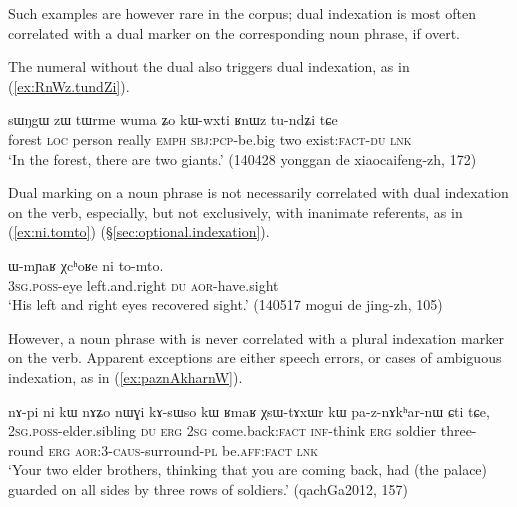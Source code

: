 Such examples are however rare in the corpus; dual indexation is most often correlated with a dual marker on the corresponding noun phrase, if overt.

The numeral  without the dual also triggers dual indexation, as in (\ref{ex:RnWz.tundZi}).

\begin{exe}
\ex \label{ex:RnWz.tundZi}
\gll   sɯŋgɯ zɯ tɯrme wuma ʑo kɯ-wxti ʁnɯz tu-ndʑi tɕe\\
forest \textsc{loc} person really \textsc{emph} \textsc{sbj}:\textsc{pcp}-be.big two exist:\textsc{fact}-\textsc{du} \textsc{lnk}\\
\glt `In the forest, there are two giants.'  (140428 yonggan de xiaocaifeng-zh, 172)
\end{exe}

Dual marking on a noun phrase is not necessarily correlated with dual indexation on the verb, especially, but not exclusively, with inanimate referents, as in (\ref{ex:ni.tomto}) (§\ref{sec:optional.indexation}).

\begin{exe}
\ex \label{ex:ni.tomto}
\gll  ɯ-mɲaʁ χcʰoʁe ni to-mto. \\
\textsc{3sg}.\textsc{poss}-eye left.and.right \textsc{du} \textsc{aor}-have.sight \\
\glt `His left and right eyes recovered sight.' (140517 mogui de jing-zh, 105)
\end{exe}

However, a noun phrase with  is never correlated with a plural indexation marker on the verb. Apparent exceptions are either speech errors, or cases of ambiguous indexation, as in (\ref{ex:paznAkharnW}).

\begin{exe}
\ex \label{ex:paznAkharnW}
 \gll  nɤ-pi ni kɯ nɤʑo nɯɣi kɤ-sɯso kɯ ʁmaʁ χsɯ-tɤxɯr kɯ pa-z-nɤkʰar-nɯ ɕti tɕe, \\
 \textsc{2sg}.\textsc{poss}-elder.sibling \textsc{du} \textsc{erg} \textsc{2sg} come.back:\textsc{fact} \textsc{inf}-think \textsc{erg} soldier three-round \textsc{erg} \textsc{aor}:3\flobv{}-\textsc{caus}-surround-\textsc{pl} be.\textsc{aff}:\textsc{fact} \textsc{lnk} \\
 \glt `Your two elder brothers, thinking that you are coming back, had (the palace) guarded on all sides by three rows of soldiers.' (qachGa2012, 157)
\end{exe}

